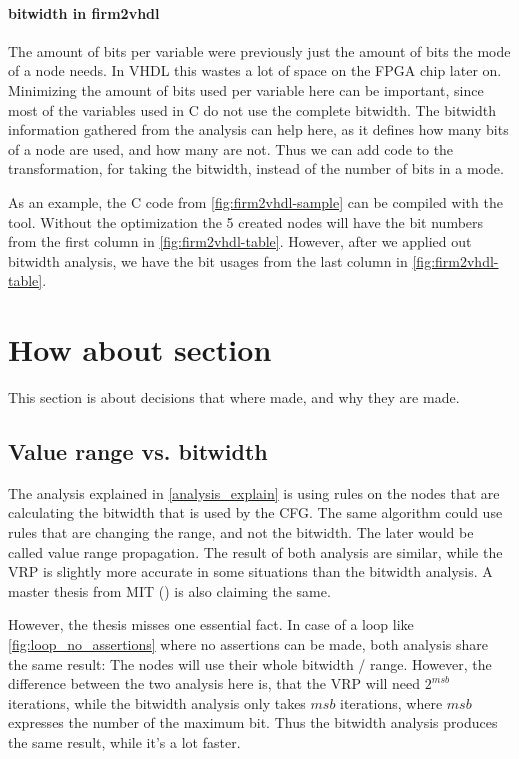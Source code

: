 \paragraph{bitwidth in firm2vhdl}
The amount of bits per variable were previously just the amount of bits the mode of a node needs. In VHDL this wastes a lot of space on the FPGA chip later on. Minimizing the amount of bits used per variable here can be important, since most of the variables used in C do not use the complete bitwidth.\newline
The bitwidth information gathered from the analysis can help here, as it defines how many bits of a node are used, and how many are not. Thus we can add code to the transformation, for taking the bitwidth, instead of the number of bits in a mode.

As an example, the C code from \ref{fig:firm2vhdl-sample} can be compiled with the tool. Without the optimization the 5 created nodes will have the bit numbers from the first column in \ref{fig:firm2vhdl-table}. However, after we applied out bitwidth analysis, we have the bit usages from the last column in \ref{fig:firm2vhdl-table}. 

\section{How about section}
This section is about decisions that where made, and why they are made.

\subsection{Value range vs. bitwidth}

The analysis explained in \ref{analysis_explain} is using rules on the nodes that are calculating the bitwidth that is used by the CFG. The same algorithm could use rules that are changing the range, and not the bitwidth. The later would be called value range propagation. The result of both analysis are similar, while the VRP is slightly more accurate in some situations than the bitwidth analysis. A master thesis from MIT (\cite{bitwidthanalysis-mit-vrp}) is also claiming the same.



However, the thesis misses one essential fact. In case of a loop like \ref{fig:loop_no_assertions} where no assertions can be made, both analysis share the same result: The nodes will use their whole bitwidth / range. However, the difference between the two analysis here is, that the VRP will need $2^{msb}$ iterations, while the bitwidth analysis only takes $msb$ iterations, where $msb$ expresses the number of the maximum bit. Thus the bitwidth analysis produces the same result, while it's a lot faster.

